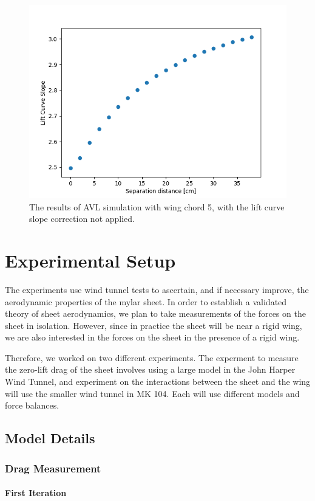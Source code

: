 \documentclass[12pt]{report} %
\begin{document}
\begin{figure}
\includegraphics[width = 0.7\linewidth]{fl_chord5_cla2pi.png}
\caption{The results of AVL simulation with wing chord 5, with the lift curve slope correction not applied.}
\label{5cm_uncorrected}
\end{figure}


\chapter{Experimental Setup}

The experiments use wind tunnel tests to ascertain, and if necessary improve, the aerodynamic properties of the mylar sheet. In order to establish
a validated theory of sheet aerodynamics, we plan to take measurements of the forces on the sheet in isolation. However, since in practice the
sheet will be near a rigid wing, we are also interested in the forces on the sheet in the presence of a rigid wing. 

Therefore, we worked on two different experiments. The experment to measure the zero-lift drag of the sheet involves using
a large model in the
John Harper Wind Tunnel, and experiment on the interactions between the sheet and the wing will use the smaller wind tunnel in MK 104. Each
will use different models and force balances.

\section{Model Details}

\subsection{Drag Measurement}

\subsubsection{First Iteration}
\end{document}

